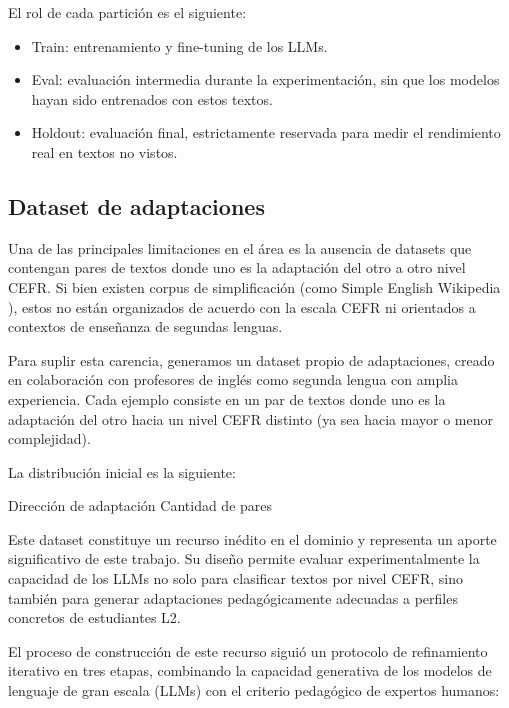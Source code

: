 El rol de cada partición es el siguiente:
\begin{itemize}
    \item Train: entrenamiento y fine-tuning de los LLMs.
    \item Eval: evaluación intermedia durante la experimentación, sin que los modelos hayan sido entrenados con estos textos.
    \item Holdout: evaluación final, estrictamente reservada para medir el rendimiento real en textos no vistos.
\end{itemize}

\subsection{Dataset de adaptaciones}\label{subsection:dataset_adaptacion}
Una de las principales limitaciones en el área es la ausencia de datasets que contengan pares de textos donde uno es la adaptación del otro a otro nivel CEFR. Si bien existen corpus de simplificación (como Simple English Wikipedia \cite{wikipedia}), estos no están organizados de acuerdo con la escala CEFR ni orientados a contextos de enseñanza de segundas lenguas.

Para suplir esta carencia, generamos un dataset propio de adaptaciones, creado en colaboración con profesores de inglés como segunda lengua con amplia experiencia. Cada ejemplo consiste en un par de textos donde uno es la adaptación del otro hacia un nivel CEFR distinto (ya sea hacia mayor o menor complejidad).

La distribución inicial es la siguiente:


Dirección de adaptación Cantidad de pares


Este dataset constituye un recurso inédito en el dominio y representa un aporte significativo de este trabajo. Su diseño permite evaluar experimentalmente la capacidad de los LLMs no solo para clasificar textos por nivel CEFR, sino también para generar adaptaciones pedagógicamente adecuadas a perfiles concretos de estudiantes L2.

El proceso de construcción de este recurso siguió un protocolo de refinamiento iterativo en tres etapas, combinando la capacidad generativa de los modelos de lenguaje de gran escala (LLMs) con el criterio pedagógico de expertos humanos:

